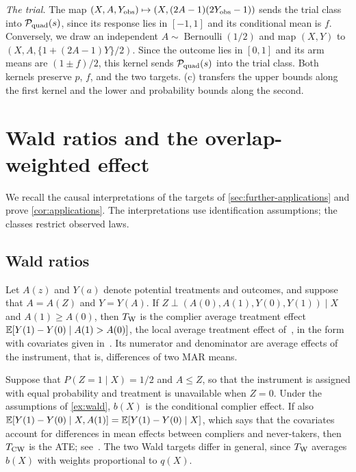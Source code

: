 \emph{The trial.} The map
$(X,A,Y_{\rm obs})\mapsto(X,(2A-1)(2Y_{\rm obs}-1))$ sends the trial
class into $\mathcal P_{\rm quad}(s)$, since its response lies in $[-1,1]$ and
its conditional mean is $f$. Conversely, we draw an independent
$A\sim\operatorname{Bernoulli}(1/2)$ and map $(X,Y)$ to
$(X,A,\{1+(2A-1)Y\}/2)$. Since the outcome lies in $[0,1]$ and its arm
means are $(1\pm f)/2$, this kernel sends $\mathcal P_{\rm quad}(s)$ into the
trial class. Both kernels preserve $p$, $f$, and the two targets.
(c) transfers the upper bounds along the first
kernel and the lower and probability bounds along the second.
\chapter{Wald ratios and the overlap-weighted effect}\label{sec:additional-effects}

We recall the causal interpretations of the targets of
\cref{sec:further-applications} and prove \cref{cor:applications}.
The interpretations use identification assumptions; the classes restrict observed laws.

\section{Wald ratios}\label{sec:wald}

\begin{example}\label{ex:wald}
Let $A(z)$ and $Y(a)$ denote potential treatments and outcomes, and
suppose that $A=A(Z)$ and $Y=Y(A)$. If
$Z\perp(A(0),A(1),Y(0),Y(1))\mid X$ and $A(1)\ge A(0)$, then
$T_{\rm W}$ is the complier average treatment effect
$\mathbb E[Y(1)-Y(0)\mid A(1)>A(0)]$, the local average treatment effect
of~\cite{imbensangrist,angristimbensrubin}, in the form with covariates
given in~\cite{frolich,dml}.
Its numerator and denominator are average effects of the instrument,
that is, differences of two MAR means.
\end{example}

\begin{example}\label{ex:conditional-wald}
Suppose that $P(Z=1\mid X)=1/2$ and $A\le Z$, so that the instrument is
assigned with equal probability and treatment is unavailable when
$Z=0$. Under the assumptions of \cref{ex:wald}, $b(X)$ is the
conditional complier effect. If also
$\mathbb E[Y(1)-Y(0)\mid X,A(1)]=\mathbb E[Y(1)-Y(0)\mid X]$, which says that the
covariates account for differences in mean effects between compliers
and never-takers, then $T_{\rm CW}$ is the ATE;
see~\cite[Theorem~1 and the following discussion]{wangtchetgen}. The two
Wald targets differ in general, since $T_{\rm W}$ averages $b(X)$ with
weights proportional to $q(X)$.
\end{example}

